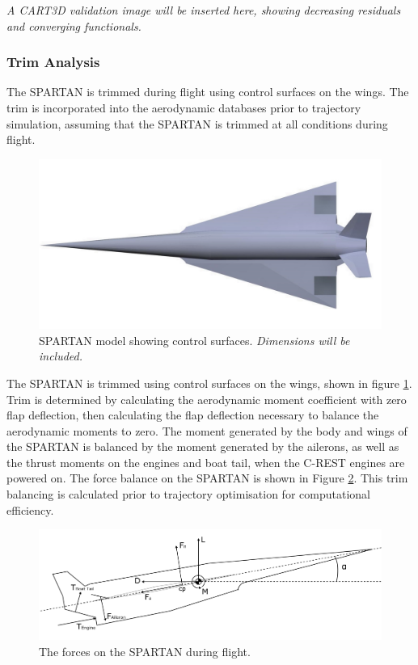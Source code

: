 						
						\textit{A CART3D validation image will be inserted here, showing decreasing residuals and converging functionals.}
		
		
		\subsubsection{Trim Analysis}\label{sec:trim}
		
		The SPARTAN is trimmed during flight using control surfaces on the wings. The trim is incorporated into the aerodynamic databases prior to trajectory simulation, assuming that the SPARTAN is trimmed at all conditions during flight. 		
		\begin{figure}[ht]
			\centering
			\includegraphics[width=0.6\linewidth]{figures/3_vehicle_design/SPARTAN_FLAPS}
			\caption{SPARTAN model showing control surfaces. \textit{Dimensions will be included.}}
			\label{fig:SPARTAN_FLAPS}
		\end{figure}
		The SPARTAN is trimmed using control surfaces on the wings, shown in figure \ref{fig:SPARTAN_FLAPS}. 
		Trim is determined by calculating the aerodynamic moment coefficient with zero flap deflection, then calculating the flap deflection necessary to balance the aerodynamic moments to zero. The moment generated by the body and wings of the SPARTAN is balanced by the moment generated by the ailerons, as well as the thrust moments on the engines and boat tail, when the C-REST engines are powered on. The force balance on the SPARTAN is shown in Figure \ref{fig:SPARTANForces}. This trim balancing is calculated prior to trajectory optimisation for computational efficiency.
		\begin{figure}[ht]
			\centering
			\includegraphics[width=0.7\linewidth]{figures/3_vehicle_design/SPARTANForces}
			\caption{The forces on the SPARTAN during flight.}
			\label{fig:SPARTANForces}
		\end{figure}
		

